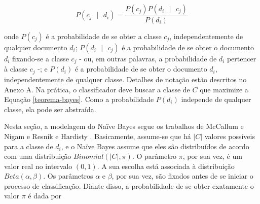 \begin{equation}
\label{teorema-bayes}
\ensuremath{P(c_j\mbox{ }|\mbox{ }d_i) = \frac{P(c_j)P(d_i\mbox{ }|\mbox{ }c_j)}{P(d_i)}}
\end{equation}

onde \ensuremath{P(c_j)} é a probabilidade de se obter a classe \ensuremath{c_j}, independentemente de qualquer documento \ensuremath{d_i}; \ensuremath{P(d_i\mbox{ }|\mbox{ }c_j)} é a probabilidade de se obter o documento \ensuremath{d_i} fixando-se a classe \ensuremath{c_j} - ou, em outras palavras, a probabilidade de \ensuremath{d_i} pertencer à classe \ensuremath{c_j} -; e \ensuremath{P(d_i)} é a probabilidade de se obter o documento \ensuremath{d_i}, independentemente de qualquer classe. Detalhes de notação estão descritos no Anexo A. Na prática, o classificador deve buscar a classe de \ensuremath{C} que maximize a Equação \ref{teorema-bayes}.  Como a probabilidade \ensuremath{P(d_i)} independe de qualquer classe, ela pode ser abstraída. 






Nesta seção, a modelagem do Naïve Bayes segue os trabalhos de McCallum e Nigam \cite{mccallum-nigam} e Resnik e Hardisty \cite{resnik}. Basicamente, assume-se que há \ensuremath{|C|} valores possíveis para a classe de \ensuremath{d_i}, e o Naïve Bayes assume que eles são distribuídos de acordo com uma distribuição \ensuremath{Binomial(|C|, \pi)}. O parâmetro \ensuremath{\pi}, por sua vez, é um valor real no intervalo \ensuremath{(0,1)}. A sua escolha está associada à distribuição \ensuremath{Beta(\alpha, \beta)}. Os parâmetros \ensuremath{\alpha} e \ensuremath{\beta}, por sua vez, são fixados antes de se iniciar o processo de classificação. Diante disso, a probabilidade de se obter exatamente o valor \ensuremath{\pi} é dada por  %





